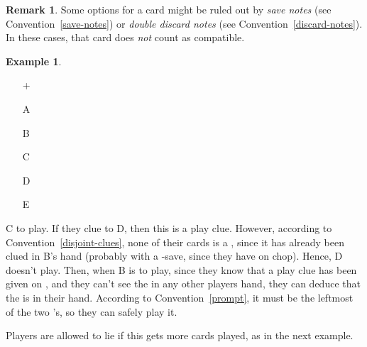 \documentclass[a4paper]{article}
\theoremstyle{plain}
\theoremstyle{definition}
\newtheorem{remark}[theorem]{Remark}
\newtheorem{example}[theorem]{Example}
\begin{document}
\begin{remark}
	Some options for a card might be ruled out by \emph{save notes} (see Convention~\ref{save-notes}) or \emph{double discard notes} (see Convention~\ref{discard-notes}). In these cases, that card does \emph{not} count as compatible.
\end{remark}

\begin{example} \hfill \\
	\begin{minipage}{0.45\textwidth}
		\begin{itemize}
			\item[\Large +]      
			\item[\Large A]    
			\item[\Large B]    
			\item[\Large C]    
			\item[\Large D]    
			\item[\Large E]    
		\end{itemize}
	\end{minipage}%
	\begin{minipage}{0.55\textwidth}
		C to play. If they clue  to D, then this is a play clue. However, according to Convention~\ref{disjoint-clues}, none of their cards is a , since it has already been clued in B's hand (probably with a -save, since they have  on chop). Hence, D doesn't play. Then, when B is to play, since they know that a play clue has been given on , and they can't see the  in any other players hand, they can deduce that the  is in their hand. According to Convention~\ref{prompt}, it must be the leftmost of the two 's, so they can safely play it.
	\end{minipage}
\end{example} \vspace{0.15 cm}

Players are allowed to lie if this gets more cards played, as in the next example.
\end{document}
